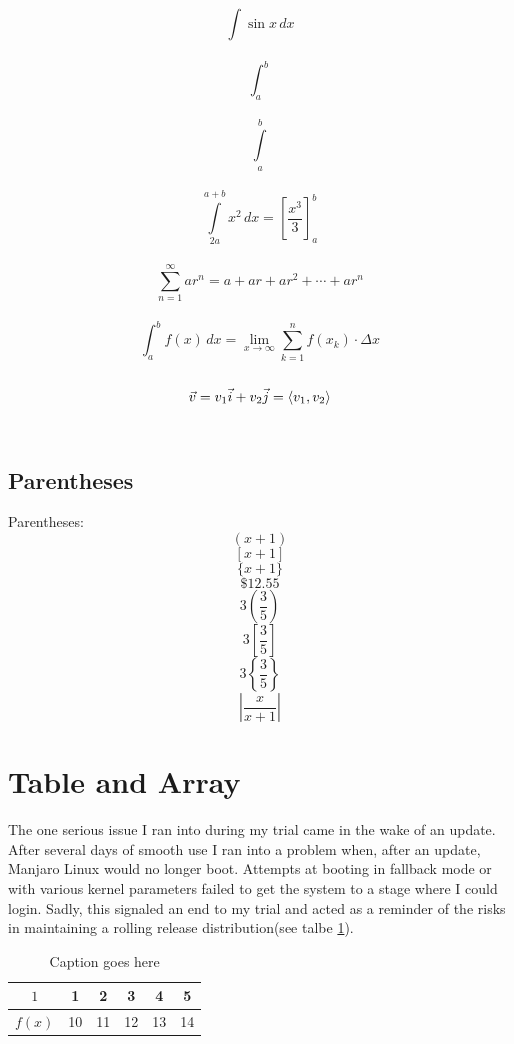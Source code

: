 \documentclass[11pt]{article}
\begin{document}
$$\displaystyle{\int \sin x\, dx }$$\\

$$\displaystyle{\int_a^b}$$\\

$$\displaystyle{\int \limits_a^b}$$\\

$$\displaystyle{\int \limits_{2a}^{a+b} x^2\,dx } =  \left[ \frac{x^3}{3} \right]_a^b$$\\

$$\displaystyle{\sum \limits_{n=1}^{\infty}ar^n = a+ar+ar^2+\cdots+ ar^n}$$\\

$$\displaystyle{\int_a^b f(x) \,dx =\lim \limits_{x \to \infty} \sum \limits_{k=1}^n f(x_k) \cdot \Delta x}$$\\

$$\vec{v} = v_1 \vec{i} + v_2 \vec{j} =\langle\\ v_1,v_2\rangle$$\\



	\subsection{Parentheses}
Parentheses:
$$(x+1)$$
$$[x+1]$$
$$\{x+1\}$$
$$\$12.55$$ 
$$3\left(\frac{3}{5}\right)$$ 
$$3\left[\frac{3}{5}\right]$$ 
$$3\left\{\frac{3}{5}\right\}$$ 
$$\left|\frac{x}{x+1}\right|$$

\section{Table and Array}
The one serious issue I ran into during my trial came in the wake of an update. After several days of smooth use I ran into a problem when, after an update, Manjaro Linux would no longer boot. Attempts at booting in fallback mode or with various kernel parameters failed to get the system to a stage where I could login. Sadly, this signaled an end to my trial and acted as a reminder of the risks in maintaining a rolling release distribution(see talbe \ref{tab:table1}). \\

\begin{table}[H] %
	\centering
		\begin{tabular}{|c|c|c|c|c|c|} \hline
		$1$ & 1 &  2 & 3 & 4 & 5 \\ \hline 
		$f(x)$ &10 & 11 & 12 & 13 & 14 \\ \hline
		\end{tabular}
	\caption{Caption goes here}
	\label{tab:table1}
\end{table}
\end{document}
